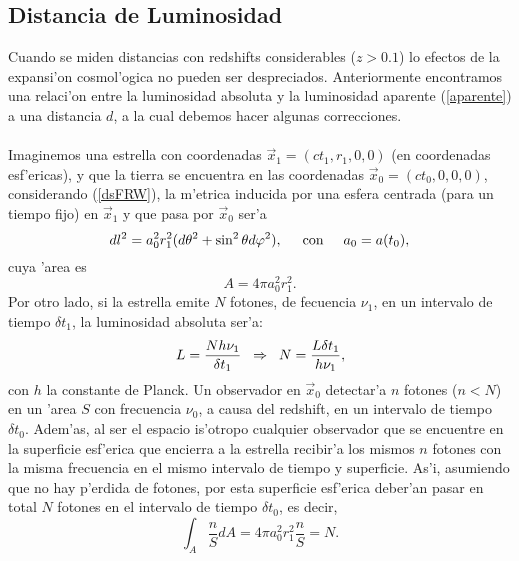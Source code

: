 \subsection{Distancia de Luminosidad}
Cuando se miden distancias con redshifts considerables ($z>0.1$) lo efectos de la expansi'on cosmol'ogica no pueden ser 
despreciados. Anteriormente encontramos una relaci'on entre la luminosidad absoluta y la luminosidad aparente (\ref{aparente})
a una distancia $d$, a la cual debemos hacer algunas correcciones.\\ \\
Imaginemos una estrella con coordenadas $\vec{x}_{1}=(ct_{1},r_{1},0,0)$ (en coordenadas esf'ericas), y que la tierra
se encuentra en las coordenadas $\vec{x}_{0}=(ct_{0},0,0,0)$, considerando (\ref{dsFRW}), la m'etrica inducida por una esfera centrada
(para un tiempo fijo) en $\vec{x}_{1}$ y que pasa por $\vec{x}_{0}$ ser'a 
\begin{equation}
 dl^2=a_{0}^2 r_{1}^2(d\theta^2  +\sin^2\theta d\varphi^2),\hspace{0.5cm} \mbox{con} \hspace{0.5cm}  a_{0}= a(t_{0}),
\end{equation}
cuya 'area es
\begin{equation}
A=4\pi a_{0}^2 r_{1}^2 . 
\end{equation}
Por otro lado, si la estrella emite $N$ fotones, de fecuencia $\nu_{1}$, en un intervalo de tiempo $\delta t_{1}$, la 
luminosidad absoluta ser'a:
\begin{equation} 
L=\frac{N h\nu_{1}}{\delta t_{1}}  \hspace{0.2cm} \Rightarrow \hspace{0.2cm} N=\frac{L\delta t_{1}}{h\nu_{1}},\label{Ltotal}
\end{equation}
con $h$ la constante de Planck. Un observador en $\vec{x}_{0}$ detectar'a $n$ fotones ($n<N$) en un 'area $S$ con frecuencia $\nu_{0}$, a causa del redshift,
en un intervalo de tiempo $\delta t_{0}$. Adem'as, al ser el espacio is'otropo cualquier observador que se encuentre en la superficie
esf'erica que encierra a la estrella recibir'a los mismos $n$ fotones con la misma frecuencia en el mismo intervalo de tiempo y superficie. As'i,
asumiendo que no hay p'erdida de fotones, por esta superficie esf'erica deber'an pasar en total $N$ fotones en el intervalo
de tiempo $\delta t_{0}$, es decir,
\begin{equation}
\int_{A}\frac{n}{S}dA=4\pi a_{0}^2 r_{1}^2 \frac{n}{S}= N.
\end{equation}
